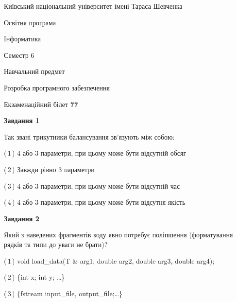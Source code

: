 \documentclass[10pt, ukrainian]{article}
\begin{document}
{{\begin {small}\par
{ \center  Київський національний університет імені Тараса Шевченка \par}
{\parbox {5 cm}{Освітня програма \hfill}{\parbox {7 cm}{Інформатика \hfill}}\parbox {6 cm}{\hfill Семестр 6}}\par
{\parbox {5 cm} {Навчальний предмет \hfill}\parbox {7 cm}{Розробка програмного забезпечення \hfill}\parbox {6cm}{\hfill}\par}\vspace{-7pt} \end{small}}{\center Екзаменаційний білет \No \textbf
{ 77 }\par}}
{
\begin {large}
{\begin {center}\textbf{Завдання 1}\end {center}}\par
Так звані трикутники балансування зв'язують між собою:\par
\vspace{2mm}



(\,1\,) 4 або 3 параметри, при цьому може бути відсутній обсяг %



(\,2\,) Завжди рівно 3 параметри%



(\,3\,) 4 або 3 параметри, при цьому може бути відсутній час%



(\,4\,) 4 або 3 параметри, при цьому може бути відсутня якість%


{\begin {center}\textbf{Завдання 2}\end {center}}\par
Який з наведених фрагментів коду явно потребує поліпшення (форматування рядків та типи до уваги не брати)?\par
\vspace{2mm}



(\,1\,) void load\_data(T \& arg1, double arg2, double arg3, double arg4); %



(\,2\,) \{int x; int y; …\}%



(\,3\,) \{fstream input\_file, output\_file;…\} %




\end{large}}
\end{document}
